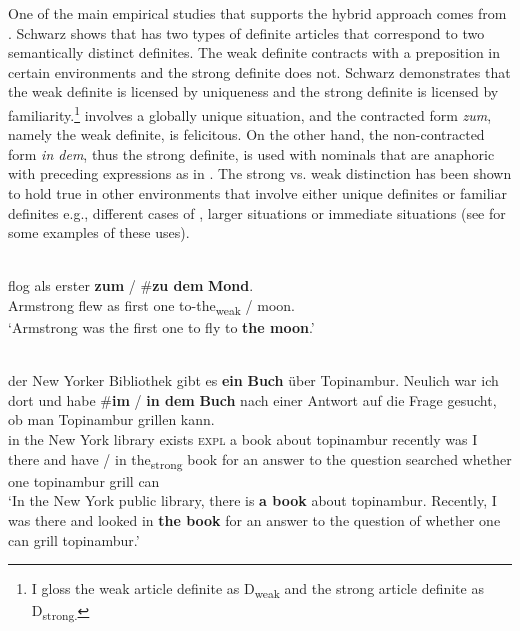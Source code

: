 \documentclass[output=paper,
modfonts
]{langscibook}
\begin{document}
One of the main empirical studies that supports the hybrid approach comes from \citet{Schwarz2009,Schwarz2013}. Schwarz shows that  has two types of definite articles that correspond to two semantically distinct definites. The weak definite contracts with a preposition in certain environments and the strong definite does not. Schwarz demonstrates that the weak definite is licensed by uniqueness and the strong definite is licensed by familiarity.\footnote{I gloss the weak article definite as D\textsubscript{weak} and the strong article definite as D\textsubscript{strong.}}  involves a globally unique situation, and the contracted form \textit{zum}, namely the weak definite, is felicitous. On the other hand, the non-contracted form \textit{in dem}, thus the strong definite, is used with nominals that are anaphoric with preceding expressions as in . The strong vs. weak distinction has been shown to hold true in other environments that involve either unique definites or familiar definites e.g., different cases of , larger situations or immediate situations (see  for some examples of these uses). 

\begin{exe}
	\ex \label{ex:sereikaite:16} 
	 \citep[40]{Schwarz2009} \\
	 {flog} {als} {erster} {\textbf{zum}} \textnormal{/} \textnormal{\#}\textbf{zu dem} \textbf{{Mond}}.\\
	Armstrong flew as {first one} {to-the\textsubscript{weak}} /  {moon}.\\
	\trans `Armstrong was the first one to fly to \textbf{the moon}.' 
\end{exe}

\begin{exe}
	\ex \label{ex:sereikaite:17} 
	 \citep[30]{Schwarz2009} \\
	 {der} {New} {Yorker} {Bibliothek} {gibt} {es} \textbf{{ein}} \textbf{{Buch}} {über} {Topinambur}. {Neulich} {war} {ich} {dort} {und} {habe} \textnormal{\#}\textbf{im} \textnormal{/} \textbf{in dem} \textbf{{Buch}} {nach} {einer} {Antwort} {auf} {die} {Frage} {gesucht}, {ob} {man} {Topinambur} {grillen} {kann}.\\
	in the New York library exists \textsc{expl} {a} {book} about topinambur recently was I there and have  / {in the\textsubscript{strong}} {book} for an answer to the question searched whether one topinambur grill can\\
	\trans `In the New York public library, there is \textbf{a book} about topinambur. Recently, I was there and looked in \textbf{the
		book} for an answer to the question of whether one can grill topinambur.’ 
\end{exe}
\end{document}
